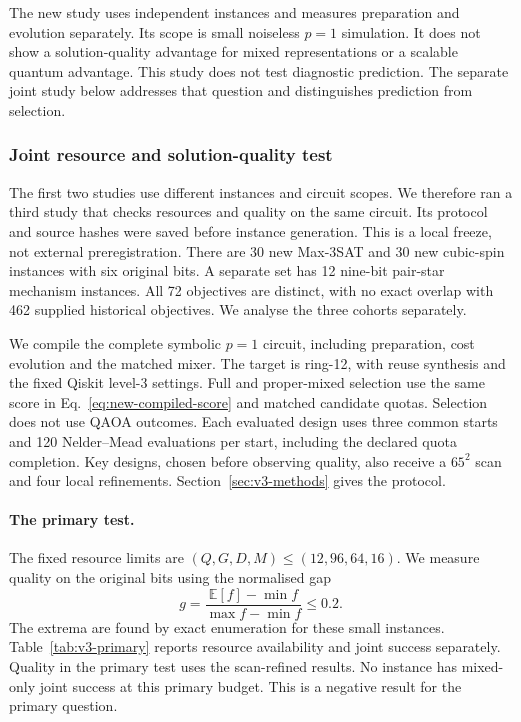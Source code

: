 \documentclass[a4paper,onecolumn,11pt,unpublished]{quantumarticle}
\theoremstyle{remark}
\begin{document}
The new study uses independent instances and measures preparation and
evolution separately. Its scope is small noiseless $p=1$ simulation.
It does not show a solution-quality advantage for mixed representations or
a scalable quantum advantage.
This study does not test diagnostic prediction. The separate joint study
below addresses that question and distinguishes prediction from selection.

\subsubsection{Joint resource and solution-quality test}
\label{sec:feedback-iteration-v3}\label{sec:v3-joint}
The first two studies use different instances and circuit scopes. We therefore
ran a third study that checks resources and quality on the same circuit.
Its protocol and source hashes were saved before instance generation.
This is a local freeze, not external preregistration.
There are 30 new Max-3SAT and 30 new cubic-spin instances with six original
bits. A separate set has 12 nine-bit pair-star mechanism instances.
All 72 objectives are distinct, with no exact overlap with 462 supplied
historical objectives. We analyse the three cohorts separately.

We compile the complete symbolic $p=1$ circuit, including preparation,
cost evolution and the matched mixer. The target is ring-12, with reuse
synthesis and the fixed Qiskit level-3 settings.
Full and proper-mixed selection use the same score in
Eq.~\eqref{eq:new-compiled-score} and matched candidate quotas.
Selection does not use QAOA outcomes. Each evaluated design uses three
common starts and 120 Nelder--Mead evaluations per start, including the
declared quota completion. Key designs, chosen before observing quality,
also receive a $65^2$ scan and four local refinements.
Section~\ref{sec:v3-methods} gives the protocol.

\paragraph{The primary test.}
The fixed resource limits are $(Q,G,D,M)\leq(12,96,64,16)$.
We measure quality on the original bits using the normalised gap
\begin{equation}
g=\frac{\mathbb E[f]-\min f}{\max f-\min f}\leq0.2.
\label{eq:v3-gap}
\end{equation}
The extrema are found by exact enumeration for these small instances.
Table~\ref{tab:v3-primary} reports resource availability and joint success
separately. Quality in the primary test uses the scan-refined results.
No instance has mixed-only joint success at this primary budget.
This is a negative result for the primary question.
\end{document}
